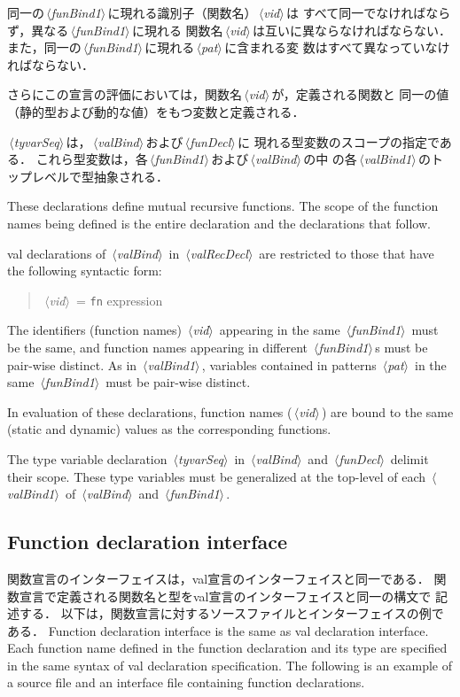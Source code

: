 \documentclass{jbook}
\newcommand{\txt}[2]{#2}
\newcommand{\nonterm}[1]{\mbox{$\,\langle$}{\it #1}\mbox{$\rangle\,$}}
\newcommand{\term}[1]{\mbox{{\tt #1}}}
\newenvironment{program}{\begin{quote}\begin{tt}}%
                        {\end{tt}\end{quote}}
\begin{document}
	同一の\nonterm{funBind1}に現れる識別子（関数名）\nonterm{vid}は
すべて同一でなければならず，異なる\nonterm{funBind1}に現れる
関数名\nonterm{vid}は互いに異ならなければならない．
	また，同一の\nonterm{funBind1}に現れる\nonterm{pat}に含まれる変
数はすべて異なっていなければならない．

	さらにこの宣言の評価においては，関数名\nonterm{vid}が，定義される関数と
同一の値（静的型および動的な値）をもつ変数と定義される．

	\nonterm{tyvarSeq}は，\nonterm{valBind}および\nonterm{funDecl}に
現れる型変数のスコープの指定である．
	これら型変数は，各\nonterm{funBind1}および\nonterm{valBind}の中
の各\nonterm{valBind1}のトップレベルで型抽象される．

\else%
	These declarations define mutual recursive functions.
	The scope of the function names being defined is the entire
declaration and the declarations that follow.

	val declarations of \nonterm{valBind} in \nonterm{valRecDecl}
are restricted to those that have the following syntactic form:
\begin{program}
\nonterm{vid} = \term{fn} {\rm expression}
\end{program}

	The identifiers (function names) \nonterm{vid} appearing in the
same \nonterm{funBind1} must be the same, and function names appearing
in different \nonterm{funBind1}s must be pair-wise distinct.
	As in \nonterm{valBind1}, variables contained in patterns
\nonterm{pat} in the same \nonterm{funBind1} must be pair-wise distinct.

	In evaluation of these declarations, function names (\nonterm{vid})
are bound to the same (static and dynamic) values as the corresponding
functions.

	The type variable declaration \nonterm{tyvarSeq} in
\nonterm{valBind} and \nonterm{funDecl} delimit their scope.
	These type variables must be generalized at the top-level of
each \nonterm{valBind1} of \nonterm{valBind} and  \nonterm{funBind1}.
\fi%


\subsection{\txt{関数宣言インターフェイス}{Function declaration interface}}
\ifjp%
	関数宣言のインターフェイスは，val宣言のインターフェイスと同一である．
	関数宣言で定義される関数名と型をval宣言のインターフェイスと同一の構文で
記述する．
	以下は，関数宣言に対するソースファイルとインターフェイスの例である．
\else%
	Function declaration interface is the same as val declaration
interface. 
	Each function name defined in the function declaration and its
type are specified in the same syntax of val declaration specification.
	The following is an example of a source file and an interface
file containing function declarations.
\fi%
\end{document}
